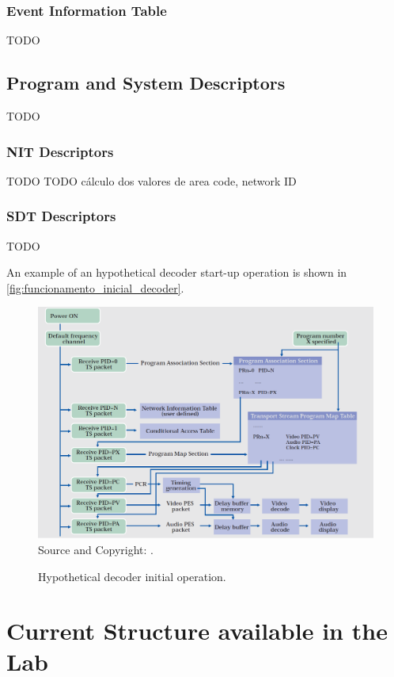 \documentclass[
	12pt,				%
	openright,			%
	twoside,			%
	a4paper,			%
	brazil,
	french,				%
	english
	]{abntex2}
\begin{document}
\subsection{Event Information Table}
\label{EIT}
TODO

\section{Program and System Descriptors}
\label{descriptors}
TODO 

\subsection{NIT Descriptors}
\label{nit_descriptors}
TODO
TODO cálculo dos valores de area code, network ID

\subsection{SDT Descriptors}
\label{nit_descriptors}
TODO

An example of an hypothetical decoder start-up operation is shown in \autoref{fig:funcionamento_inicial_decoder}.

\begin{figure}[!hb]
\centering
\caption{Hypothetical decoder initial operation.}
\includegraphics[width=0.8\linewidth]{figuras/funcionamento_inicial_decoder.png}
\\Source and Copyright: \cite{nhk}.
\label{fig:funcionamento_inicial_decoder}
\end{figure}


\chapter{Current Structure available in the Lab}
\end{document}
